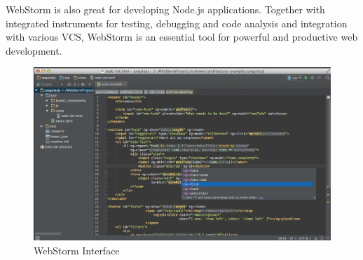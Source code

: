 WebStorm is also great for developing Node.js applications. Together with integrated instruments 
for testing, debugging and code analysis and integration with various VCS, WebStorm is an essential tool for powerful and productive web development.
\\

\begin{figure}[h]
\centering
\includegraphics[width=1\linewidth]{graphics/chapter3/1}
\caption{WebStorm Interface}
\label{}
\end{figure}


